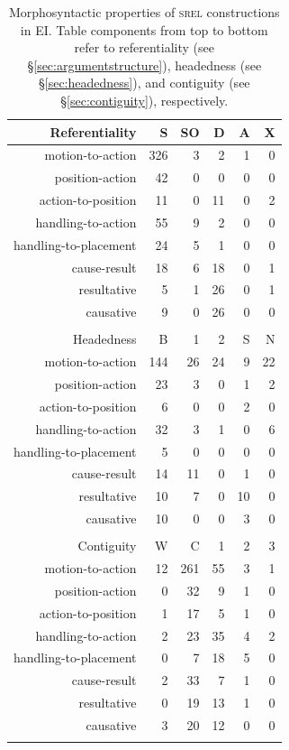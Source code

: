 \begin{table}
\centering
\begin{tabular}{rrrrrr}
  \lsptoprule
Referentiality & S & SO & D & A & X \\ 
  \hline
  motion-to-action & 326 &   3 &   2 &   1 &   0 \\ 
  position-action &  42 &   0 &   0 &   0 &   0 \\ 
  action-to-position &  11 &   0 &  11 &   0 &   2 \\ 
  handling-to-action &  55 &   9 &   2 &   0 &   0 \\ 
  handling-to-placement &  24 &   5 &   1 &   0 &   0 \\ 
  cause-result &  18 &   6 &  18 &   0 &   1 \\ 
  resultative &   5 &   1 &  26 &   0 &   1 \\ 
  causative &   9 &   0 &  26 &   0 &   0 \\ 
   \hline
 \\
  \hline
Headedness & B & 1 & 2 & S & N \\ 
  \hline
  motion-to-action & 144 &  26 &  24 &   9 &  22 \\ 
  position-action &  23 &   3 &   0 &   1 &   2 \\ 
  action-to-position &   6 &   0 &   0 &   2 &   0 \\ 
  handling-to-action &  32 &   3 &   1 &   0 &   6 \\ 
  handling-to-placement &   5 &   0 &   0 &   0 &   0 \\ 
  cause-result &  14 &  11 &   0 &   1 &   0 \\ 
  resultative &  10 &   7 &   0 &  10 &   0 \\ 
  causative &  10 &   0 &   0 &   3 &   0 \\ 
   \hline
 \\
  \hline
Contiguity & W & C & 1 & 2 & 3 \\ 
  \hline
  motion-to-action &  12 & 261 &  55 &   3 &   1 \\ 
  position-action &   0 &  32 &   9 &   1 &   0 \\ 
  action-to-position &   1 &  17 &   5 &   1 &   0 \\ 
  handling-to-action &   2 &  23 &  35 &   4 &   2 \\ 
  handling-to-placement &   0 &   7 &  18 &   5 &   0 \\ 
  cause-result &   2 &  33 &   7 &   1 &   0 \\ 
  resultative &   0 &  19 &  13 &   1 &   0 \\ 
  causative &   3 &  20 &  12 &   0 &   0 \\ 
   \lspbottomrule
\end{tabular}
\caption[Morphosyntactic properties of \textsc{srel} constructions]{Morphosyntactic properties of \textsc{srel} constructions in EI. Table components from top to bottom refer to referentiality (see §\ref{sec:argumentstructure}), headedness (see §\ref{sec:headedness}), and contiguity (see §\ref{sec:contiguity}), respectively.}
\label{table:SREL_formal}
\end{table}


